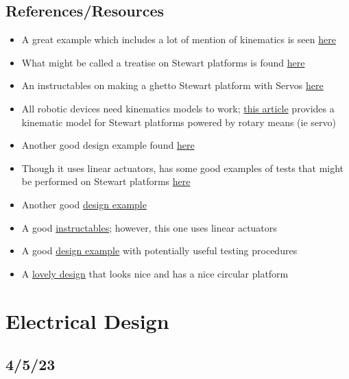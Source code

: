 \documentclass[a4paper, 10pt]{article}
\begin{document}
	\subsection{References/Resources}
	\begin{itemize}
		\item A great example which includes a lot of mention of kinematics is seen \href{https://ntrs.nasa.gov/api/citations/19910007810/downloads/19910007810.pdf}{here}
		\item What might be called a treatise on Stewart platforms is found \href{https://www.ri.cmu.edu/pub_files/pub4/fong_terrence_w_1990_1/fong_terrence_w_1990_1.pdf}{here}
		\item An instructables on making a ghetto Stewart platform with Servos \href{https://www.instructables.com/Stewart-Platform/}{here}
		\item All robotic devices need kinematics models to work; \href{https://www.xarg.org/paper/inverse-kinematics-of-a-stewart-platform/}{this article} provides a kinematic model for Stewart platforms powered by rotary means (ie servo)
		\item Another good design example found \href{https://iopscience.iop.org/article/10.1088/1757-899X/563/5/052059/pdf}{here}
		\item Though it uses linear actuators, has some good examples of tests that might be performed on Stewart platforms \href{https://www.ncbi.nlm.nih.gov/pmc/articles/PMC6513003/}{here}
		\item Another good \href{https://core.ac.uk/download/pdf/322824733.pdf}{design example}
		\item A good \href{https://www.instructables.com/Six-Axis-Platform-Using-Linear-Actuators-Stewart-P/}{instructables}; however, this one uses linear actuators
		\item A good \href{https://www.ohio.edu/mechanical-faculty/williams/html/PDF/IndRob02.pdf}{design example} with potentially useful testing procedures
		\item A \href{https://www.mdpi.com/2218-6581/7/2/30}{lovely design} that looks nice and has a nice circular platform
	\end{itemize}
	
	
\newpage	
	
\section{Electrical Design}
	\subsection{4/5/23}
\end{document}
